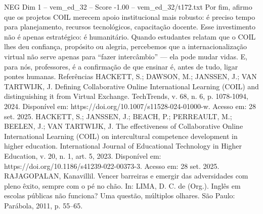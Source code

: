 \begin{textsample}{NEG Dim 1 – vem\_ed\_32 – Score -1.00 – vem\_ed\_32/t172.txt}
Por fim, afirmo que os projetos COIL merecem apoio institucional mais robusto: é preciso tempo para planejamento, recursos tecnológicos, capacitação docente.
Esse investimento não é apenas estratégico: é humanitário.
Quando estudantes relatam que o COIL lhes deu confiança, propósito ou alegria, percebemos que a internacionalização virtual não serve apenas para “fazer intercâmbio” — ela pode mudar vidas.
E, para nós, professores, é a confirmação de que ensinar é, antes de tudo, ligar pontes humanas.
Referências HACKETT, S.; DAWSON, M.; JANSSEN, J.; VAN TARTWIJK, J.
Defining Collaborative Online International Learning (COIL) and distinguishing it from Virtual Exchange.
TechTrends, v. 68, n. 6, p. 1078-1094, 2024.
Disponível em: https://doi.org/10.1007/s11528-024-01000-w.
Acesso em: 28 set. 2025.
HACKETT, S.; JANSSEN, J.; BEACH, P.; PERREAULT, M.; BEELEN, J.; VAN TARTWIJK, J.
The effectiveness of Collaborative Online International Learning (COIL) on intercultural competence development in higher education.
International Journal of Educational Technology in Higher Education, v. 20, n. 1, art. 5, 2023.
Disponível em: https://doi.org/10.1186/s41239-022-00373-3.
Acesso em: 28 set. 2025.
RAJAGOPALAN, Kanavillil.
Vencer barreiras e emergir das adversidades com pleno êxito, sempre com o pé no chão.
In: LIMA, D.
C. de (Org.).
Inglês em escolas públicas não funciona?
Uma questão, múltiplos olhares.
São Paulo: Parábola, 2011, p. 55–65.

\end{textsample}
